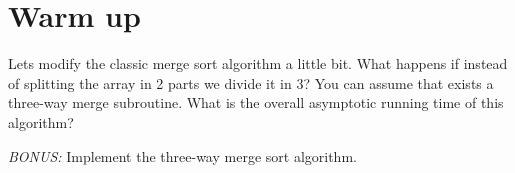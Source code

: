 \section{Warm up}

Lets modify the classic merge sort algorithm a little bit. What happens if instead of splitting the array in 2 parts we divide it in 3? You can assume that exists a three-way merge subroutine. What is the overall asymptotic running time of this algorithm?

\emph{BONUS:} Implement the three-way merge sort algorithm.


